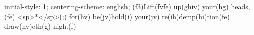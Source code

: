 initial-style: 1;
centering-scheme: english;
(f3)Lift(fvfe) up(ghiv) your(hg) heads,(fe) <sp>*</sp>(;) for(hv) be(jv)hold(i) your(jv) re(ih)demp(hi)tion(fe) draw(hv)eth(g) nigh.(f)
